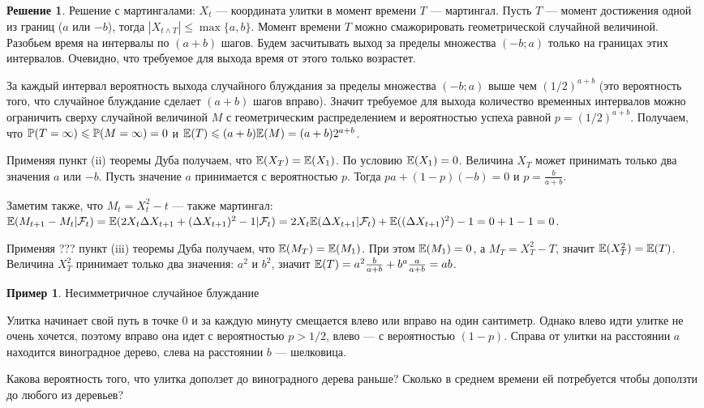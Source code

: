 \documentclass[pdftex,12pt,a4paper]{article}
\numberwithin{equation}{page} %
\theoremstyle{definition} %
\theoremstyle{definition}
\newtheorem{example}[equation]{Пример}
\theoremstyle{definition}
\newtheorem*{solution}{Решение}
\theoremstyle{definition}
\begin{document}
\begin{solution}
Решение с мартингалами: $X_{t}$ --- координата улитки в момент времени $T$ --- мартингал. Пусть $T$ --- момент достижения одной из границ ($a$ или $-b$), тогда $|X_{t\wedge T}|\leq \max\{a,b\}$. Момент времени $T$ можно смажорировать геометрической случайной величиной. Разобьем время на интервалы по $(a+b)$ шагов. Будем засчитывать выход за пределы множества $(-b;a)$ только на границах этих интервалов. Очевидно, что требуемое для выхода время от этого только возрастет. 

За каждый интервал вероятность выхода случайного блуждания за пределы множества $(-b;a)$ выше чем $(1/2)^{a+b}$ (это вероятность того, что случайное блуждание сделает $(a+b)$ шагов вправо). Значит требуемое для выхода количество временных интервалов можно ограничить сверху случайной величиной $M$ с геометрическим распределением и вероятностью успеха равной $p=(1/2)^{a+b}$. Получаем, что $\P(T=\infty)\leq \P(M=\infty)=0$ и $\E(T)\leq (a+b) \E(M)=(a+b) 2^{a+b}$.

Применяя пункт (ii) теоремы Дуба получаем, что $\E(X_{T})=\E(X_{1})$. По условию $\E(X_{1})=0$. Величина $X_{T}$ может принимать только два значения $a$ или $-b$. Пусть значение $a$ принимается с вероятностью $p$. Тогда $pa+(1-p)(-b)=0$ и $p=\frac{b}{a+b}$.

Заметим также, что $M_{t}=X^{2}_{t}-t$ --- также мартингал: $\E(M_{t+1}-M_{t}|\mathcal{F}_{t})=\E(2X_{t}\Delta X_{t+1}+(\Delta X_{t+1})^{2}-1|\mathcal{F}_{t})=2X_{t}\E(\Delta X_{t+1}|\mathcal{F}_{t})+\E((\Delta X_{t+1})^{2})-1=0+1-1=0$. 

Применяя ??? пункт (iii) теоремы Дуба получаем, что $\E(M_{T})=\E(M_{1})$. При этом $\E(M_{1})=0$, а $M_{T}=X_{T}^{2}-T$, значит $\E(X_{T}^{2})=\E(T)$. Величина $X_{T}^{2}$ принимает только два значения: $a^{2}$ и $b^{2}$, значит $\E(T)=a^{2}\frac{b}{a+b}+b^{a}\frac{a}{a+b}=ab$.
\end{solution}

\begin{example} Несимметричное случайное блуждание 

Улитка начинает свой путь в точке 0 и за каждую минуту смещается влево или вправо на один сантиметр. Однако влево идти улитке не очень хочется, поэтому вправо она идет с вероятностью $p>1/2$, влево --- с вероятностью $(1-p)$. Справа от улитки на расстоянии $a$ находится виноградное дерево, слева на расстоянии $b$ --- шелковица.

Какова вероятность того, что улитка доползет до виноградного дерева раньше? Сколько в среднем времени ей потребуется чтобы доползти до любого из деревьев?
\end{example}
\end{document}
